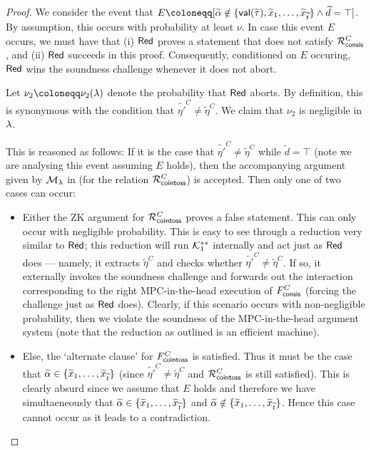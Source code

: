 \begin{proof}
 We consider the event that $E \coloneqq[\tilde{\alpha} \notin \Set{\msf{val}(\tilde{\tau}),\tilde{x}_1,\dots,\tilde{x}_{\tilde{t}}} \wedge \tilde{d} = \top]$. By assumption, this occurs with probability at least $\nu$. In case this event $E$ occurs, we must have that (i) $\mathsf{Red}$ proves a statement that does not satisfy $\mathcal{R}^C_\mathsf{consis}$, and (ii) $\mathsf{Red}$ succeeds in this proof. Consequently, conditioned on $E$ occuring, $\mathsf{Red}$ wins the soundness challenge whenever it does not abort. 

Let $\nu_2 \coloneqq \nu_2(\secpar)$ denote the probability that $\mathsf{Red}$ aborts. By definition, this is synonymous with the condition that $\tilde{\eta'}^{C} \neq \tilde{\eta}^{C}$. We claim that $\nu_2$ is negligible in $\lambda$. 

This is reasoned as follows: If it is the case that $\tilde{\eta'}^{C} \neq \tilde{\eta}^{C}$ while $\tilde{d} = \top$ (note we are analysing this event assuming $E$ holds), then the accompanying argument given by $\mathcal{M}_\lambda$ in  (for the relation $\mathcal{R}^C_\mathsf{cointoss}$) is accepted. Then only one of two cases can occur: 
\begin{itemize}
    \item Either the ZK argument for $\mathcal{R}^C_\mathsf{cointoss}$ proves a false statement. This can only occur with negligible probability. This is easy to see through a reduction very similar to $\mathsf{Red}$; this reduction will run $\mathcal{K}_1^{**}$ internally and act just as $\mathsf{Red}$ does --- namely, it extracts $\tilde{\eta}^C$ and checks whether $\tilde{\eta'}^{C} \neq \tilde{\eta}^{C}$. If so, it externally invokes the soundness challenge and forwards out the interaction corresponding to the right MPC-in-the-head execution of $F^C_\mathsf{consis}$ (forcing the challenge just as $\mathsf{Red}$ does). Clearly, if this scenario occurs with non-negligible probability, then we violate the soundness of the MPC-in-the-head argument system (note that the reduction as outlined is an efficient machine). 
    \item Else, the `alternate clause' for $F^C_\mathsf{cointoss}$ is satisfied. Thus it must be the case that $\widetilde{\alpha} \in \{\widetilde{x}_1,\dots,\widetilde{x}_{\widetilde{t}}\}$ (since $\tilde{\eta'}^{C} \neq \tilde{\eta}^{C}$ and $\mathcal{R}^C_\mathsf{cointoss}$ is still satisfied). This is clearly absurd since we assume that $E$ holds and therefore we have simultaeneously that $\widetilde{\alpha} \in \{\widetilde{x}_1,\dots,\widetilde{x}_{\widetilde{t}}\}$ and $\widetilde{\alpha} \notin \{\widetilde{x}_1,\dots,\widetilde{x}_{\widetilde{t}}\}$. Hence this case cannot occur as it leads to a contradiction. 

\end{itemize}
\end{proof}
